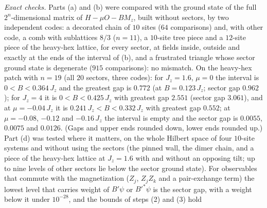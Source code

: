 \documentclass[aps,prx,onecolumn,10pt,nofootinbib,longbibliography,floatfix]{revtex4-2}
\theoremstyle{remark}
\newcommand{\Jz}{J_z}
\begin{document}
\emph{Exact checks.} Parts (a) and (b) were compared with the ground state of the full $2^n$-dimensional matrix of
$H-\mu O-BM_z$, built without sectors, by two independent codes: a decorated chain of $10$ sites ($64$ comparisons) %
and, with other code, a comb with sublattices $8/3$ ($n=11$), a $10$-site tree piece and a $12$-site piece of the %
heavy-hex lattice, for every sector, at fields inside, outside and exactly at the ends of the interval of (b), and
a frustrated triangle whose sector ground state is degenerate ($915$ comparisons): no mismatch. On the heavy-hex %
patch with $n=19$ (all $20$ sectors, three codes): for $\Jz=1.6$, $\mu=0$ the interval is $0<B<0.364\,\Jz$ and the %
greatest gap is $0.772$ (at $B=0.123\,\Jz$; sector gap $0.962$); for $\Jz=4$ it is $0<B<0.425\,\Jz$ with greatest %
gap $2.551$ (sector gap $3.061$), and at $\mu=-0.04\,\Jz$ it is $0.241\,\Jz<B<0.332\,\Jz$ with greatest gap $0.552$; %
at $\mu=-0.08$, $-0.12$ and $-0.16\,\Jz$ the interval is empty and the sector gap is $0.0055$, $0.0075$ and %
$0.0126$. (Gaps and upper ends rounded down, lower ends rounded up.) %
Part (d) was tested where it matters, on the whole Hilbert space of four $10$-site systems and without using the %
sectors (the pinned wall, the dimer chain, and a piece of the heavy-hex lattice at $\Jz=1.6$ with and without an
opposing tilt; up to nine levels of other sectors lie below the sector ground state). For observables that commute
with the magnetization ($Z_j$, $Z_jZ_k$ and a pair-exchange term) the lowest level that carries weight of $B'\psi$
or $B'^*\psi$ is the sector gap, with a weight below it under $10^{-28}$, and the bounds of steps (2) and (3) hold %
\end{document}
